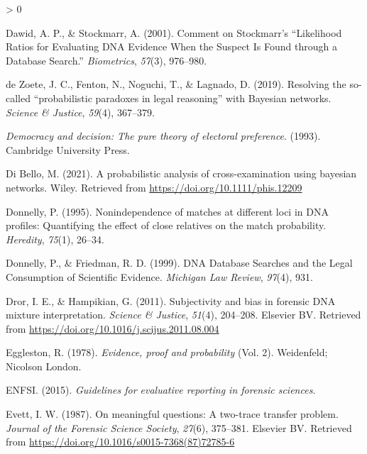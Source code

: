 \documentclass[
  10pt,
  dvipsnames,enabledeprecatedfontcommands]{scrartcl}
\newlength{\cslhangindent}
\newenvironment{CSLReferences}[2] %
 {%
  \setlength{\parindent}{0pt}
  \ifodd #1 \everypar{\setlength{\hangindent}{\cslhangindent}}\ignorespaces\fi
  \ifnum #2 > 0
  \setlength{\parskip}{#2\baselineskip}
  \fi
 }%
 {}
\begin{document}
\begin{CSLReferences}{1}{0}
\leavevmode\hypertarget{ref-dawid2001CommentStockmarrLikelihood}{}%
Dawid, A. P., \& Stockmarr, A. (2001). Comment on {Stockmarr}'s
{``{Likelihood Ratios} for {Evaluating DNA Evidence When} the {Suspect
Is Found} through a {Database Search}.''} \emph{Biometrics},
\emph{57}(3), 976--980.

\leavevmode\hypertarget{ref-dezoete2019ResolvingSocalledProbabilistic}{}%
de Zoete, J. C., Fenton, N., Noguchi, T., \& Lagnado, D. (2019).
Resolving the so-called {``probabilistic paradoxes in legal reasoning''}
with {Bayesian} networks. \emph{Science \& Justice}, \emph{59}(4),
367--379.

\leavevmode\hypertarget{ref-brennan_lomasky_1993}{}%
\emph{Democracy and decision: The pure theory of electoral preference}.
(1993). Cambridge University Press.

\leavevmode\hypertarget{ref-Bello2021probabilisticCrossexamination}{}%
Di Bello, M. (2021). A probabilistic analysis of cross-examination using
bayesian networks. Wiley. Retrieved from
\url{https://doi.org/10.1111/phis.12209}

\leavevmode\hypertarget{ref-donnelly1995NonindependenceMatchesDifferent}{}%
Donnelly, P. (1995). Nonindependence of matches at different loci in
{DNA} profiles: Quantifying the effect of close relatives on the match
probability. \emph{Heredity}, \emph{75}(1), 26--34.

\leavevmode\hypertarget{ref-donnelly1999DNADatabaseSearches}{}%
Donnelly, P., \& Friedman, R. D. (1999). {DNA Database Searches} and the
{Legal Consumption} of {Scientific Evidence}. \emph{Michigan Law
Review}, \emph{97}(4), 931.

\leavevmode\hypertarget{ref-Dror2011subjectivity}{}%
Dror, I. E., \& Hampikian, G. (2011). Subjectivity and bias in forensic
{DNA} mixture interpretation. \emph{Science {\&} Justice}, \emph{51}(4),
204--208. Elsevier {BV}. Retrieved from
\url{https://doi.org/10.1016/j.scijus.2011.08.004}

\leavevmode\hypertarget{ref-eggleston1978evidence}{}%
Eggleston, R. (1978). \emph{Evidence, proof and probability} (Vol. 2).
Weidenfeld; Nicolson London.

\leavevmode\hypertarget{ref-enfs2015}{}%
ENFSI. (2015). \emph{Guidelines for evaluative reporting in forensic
sciences}.

\leavevmode\hypertarget{ref-Evett1987}{}%
Evett, I. W. (1987). On meaningful questions: A two-trace transfer
problem. \emph{Journal of the Forensic Science Society}, \emph{27}(6),
375--381. Elsevier {BV}. Retrieved from
\url{https://doi.org/10.1016/s0015-7368(87)72785-6}


\end{CSLReferences}
\end{document}
